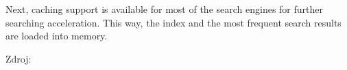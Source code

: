Next, caching support is available for most of the search engines for further searching acceleration. 
This way, the index and the most frequent search results are loaded into memory.

Zdroj: \cite{Solr3EnterpriseSS}


%
%
%
%
%
%
%
%


